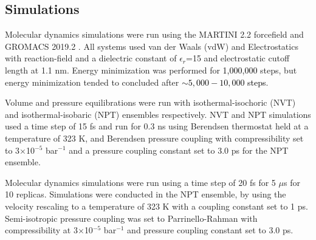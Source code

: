 \documentclass[%
 aip,
 amsmath,amssymb,
 preprint,%
]{revtex4-1}\usepackage{setspace}
\newcommand{\liam}[1]{\textcolor{black}{#1}}
\begin{document}
\subsection{Simulations}

Molecular dynamics simulations were run using the MARTINI 2.2\cite{DeJong2012} forcefield and GROMACS\cite{Berendsen1995,Abraham2015}  2019.2 . All systems used van der Waals (vdW) and Electrostatics with reaction-field and a dielectric constant of $\epsilon_r$=15 and electrostatic cutoff length at 1.1 nm. Energy minimization was performed for \liam{1,000,000} steps, but energy minimization tended to concluded after \liam{$\sim 5,000-10,000$ steps}.

Volume and pressure equilibrations were run with isothermal-isochoric (NVT) and isothermal-isobaric (NPT) ensembles respectively. NVT and NPT simulations used a time step of 15 fs and run for 0.3 ns using Berendsen thermostat held at a temperature of 323 K, and Berendsen pressure coupling with compressibility set to 3$\times$10$^{-5}$ bar$^{-1}$ and a pressure coupling constant set to 3.0 ps  for the NPT ensemble. 

Molecular dynamics simulations were run using a time step of 20 fs for 5 $\mu$s for 10 replicas. Simulations were conducted in the NPT ensemble, by using the velocity rescaling to a temperature of 323 K with a coupling constant set to 1 ps. Semi-isotropic pressure coupling was set to Parrinello-Rahman with compressibility at 3$\times$10$^{-5}$ bar$^{-1}$ and pressure coupling constant set to 3.0 ps. 
\end{document}
